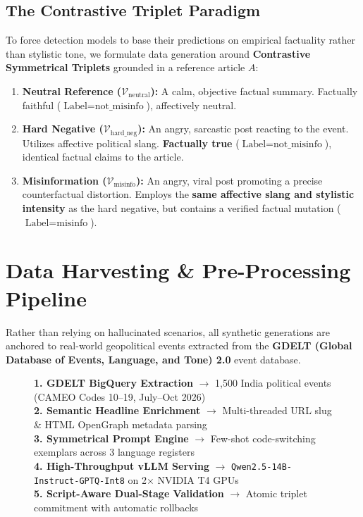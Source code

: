 \documentclass[11pt,a4paper]{article}
\begin{document}
\subsection{The Contrastive Triplet Paradigm}
To force detection models to base their predictions on empirical factuality rather than stylistic tone, we formulate data generation around \textbf{Contrastive Symmetrical Triplets} grounded in a reference article $A$:
\begin{enumerate}[leftmargin=*]
    \item \textbf{Neutral Reference ($\mathcal{V}_{\text{neutral}}$):} A calm, objective factual summary. Factually faithful ($\text{Label} = \text{not\_misinfo}$), affectively neutral.
    \item \textbf{Hard Negative ($\mathcal{V}_{\text{hard\_neg}}$):} An angry, sarcastic post reacting to the event. Utilizes affective political slang. \textbf{Factually true} ($\text{Label} = \text{not\_misinfo}$), identical factual claims to the article.
    \item \textbf{Misinformation ($\mathcal{V}_{\text{misinfo}}$):} An angry, viral post promoting a precise counterfactual distortion. Employs the \textbf{same affective slang and stylistic intensity} as the hard negative, but contains a verified factual mutation ($\text{Label} = \text{misinfo}$).
\end{enumerate}

\section{Data Harvesting \& Pre-Processing Pipeline}
Rather than relying on hallucinated scenarios, all synthetic generations are anchored to real-world geopolitical events extracted from the \textbf{GDELT (Global Database of Events, Language, and Tone) 2.0} event database.

\begin{figure}[htbp]
\centering
\begin{tcolorbox}[colback=boxbg,colframe=primaryblue,title=\textbf{System Architecture \& Generation Workflow}]
\small
\textbf{1. GDELT BigQuery Extraction} $\rightarrow$ 1,500 India political events (CAMEO Codes 10--19, July--Oct 2026) \\
\textbf{2. Semantic Headline Enrichment} $\rightarrow$ Multi-threaded URL slug \& HTML OpenGraph metadata parsing \\
\textbf{3. Symmetrical Prompt Engine} $\rightarrow$ Few-shot code-switching exemplars across 3 language registers \\
\textbf{4. High-Throughput vLLM Serving} $\rightarrow$ \texttt{Qwen2.5-14B-Instruct-GPTQ-Int8} on 2$\times$ NVIDIA T4 GPUs \\
\textbf{5. Script-Aware Dual-Stage Validation} $\rightarrow$ Atomic triplet commitment with automatic rollbacks
\end{tcolorbox}
\end{figure}
\end{document}
